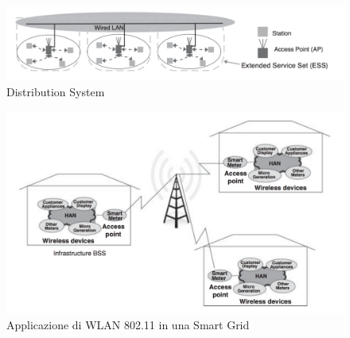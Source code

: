 \begin{figure}[h]
	\centering
	\includegraphics[scale=0.350]{imgs/ds.png}
	\caption{Distribution System} \label{fig:ds}
\end{figure}
\begin{figure}[h]
	\centering
	\includegraphics[scale=0.350]{imgs/80211smartgrid.png}
	\caption{Applicazione di WLAN 802.11 in una Smart Grid} \label{fig:802_sg}
\end{figure}\newpage
